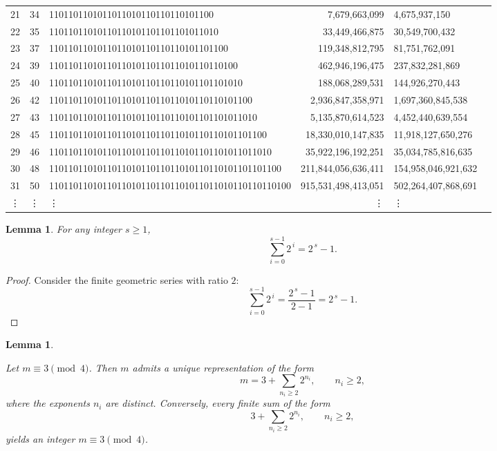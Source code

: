 \documentclass{amsart}
\newtheorem{lemma}[theorem]{Lemma}
\theoremstyle{definition}
\theoremstyle{remark}
\numberwithin{equation}{section}
\begin{document}
\begin{table}[ht]
\begin{tabular}{p{}p{}p{}rp{}p{}}
			21 & 34	& 1101101101011011010110110110101100 & 7,679,663,099 & 4,675,937,150\\
			22 & 35	& 11011011010110110101101101101011010 &	33,449,466,875 & 30,549,700,432\\
			23 & 37	& 1101101101011011010110110110101101100	& 119,348,812,795 & 81,751,762,091\\
			24 & 39	& 110110110101101101011011011010110110100 &	462,946,196,475 & 237,832,281,869\\
			25 & 40	& 1101101101011011010110110110101101101010 & 188,068,289,531 & 144,926,270,443\\
			26 & 42	& 110110110101101101011011011010110110101100 & 2,936,847,358,971 & 1,697,360,845,538\\
			27 & 43	& 1101101101011011010110110110101101101011010 &	5,135,870,614,523 & 4,452,440,639,554\\
			28 & 45	& 110110110101101101011011011010110110101101100 & 18,330,010,147,835 & 11,918,127,650,276\\
			29 & 46	& 1101101101011011010110110110101101101011011010 & 35,922,196,192,251 & 35,034,785,816,635\\
			30 & 48	& 110110110101101101011011011010110110101101101100 & 211,844,056,636,411 & 154,958,046,921,632\\
			31 & 50	& 11011011010110110101101101101011011010110110110100 & 915,531,498,413,051 & 502,264,407,868,691\\
																
			\vdots	&	\vdots	&	\vdots & \vdots &\vdots 	\\	
			\bottomrule
		\end{tabular}
	\end{table}
\normalsize


\begin{lemma}\label{lem:pow2}
	For any integer $s \ge 1$,
	\[
	\sum_{i=0}^{s-1} 2^{\,i} = 2^{\,s} - 1.
	\]
\end{lemma}

\begin{proof}
	Consider the finite geometric series with ratio $2$:
	\[
	\sum_{i=0}^{s-1} 2^{\,i} = \frac{2^{\,s} - 1}{2 - 1} = 2^{\,s} - 1.
	\]
\end{proof}


\begin{lemma}\label{lem:3mod4}

Let $m \equiv 3 \pmod{4}$. Then $m$ admits a unique representation of the form
$$ m = 3 + \sum_{n_i\ge2} 2^{n_i}, \qquad n_i \ge 2, $$
where the exponents $n_i$ are distinct. Conversely, every finite sum of the form
$$ 3 + \sum_{n_i\ge2} 2^{n_i}, \qquad n_i \ge 2,$$
yields an integer $m \equiv 3 \pmod{4}$.

\end{lemma}
\end{document}
